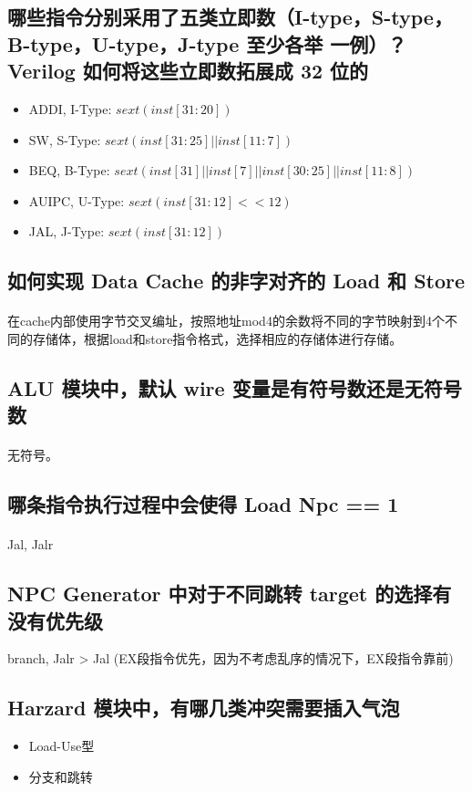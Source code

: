 \documentclass{article}
\begin{document}
    \subsection{哪些指令分别采用了五类立即数（I-type，S-type，B-type，U-type，J-type 至少各举
    一例）？Verilog 如何将这些立即数拓展成 32 位的}
    \begin{itemize}
        \item ADDI, I-Type: $sext(inst[31:20])$
        \item SW, S-Type: $sext(inst[31:25] || inst[11:7])$
        \item BEQ, B-Type: $sext(inst[31]||inst[7]||inst[30:25]||inst[11:8])$
        \item AUIPC, U-Type: $sext(inst[31:12]<<12)$
        \item JAL, J-Type: $sext(inst[31:12])$
    \end{itemize}
    \subsection{如何实现 Data Cache 的非字对齐的 Load 和 Store}
    \paragraph{}
    在cache内部使用字节交叉编址，按照地址mod4的余数将不同的字节映射到4个不同的存储体，根据load和store指令格式，选择相应的存储体进行存储。
    \subsection{ALU 模块中，默认 wire 变量是有符号数还是无符号数}
    \paragraph{}
    无符号。
    \subsection{哪条指令执行过程中会使得 Load Npc == 1}
    \paragraph{}
    Jal, Jalr
    \subsection{NPC Generator 中对于不同跳转 target 的选择有没有优先级}
    branch, Jalr > Jal (EX段指令优先，因为不考虑乱序的情况下，EX段指令靠前)
    \subsection{Harzard 模块中，有哪几类冲突需要插入气泡}
    \begin{itemize}
        \item Load-Use型
        \item 分支和跳转
    \end{itemize}
\end{document}

